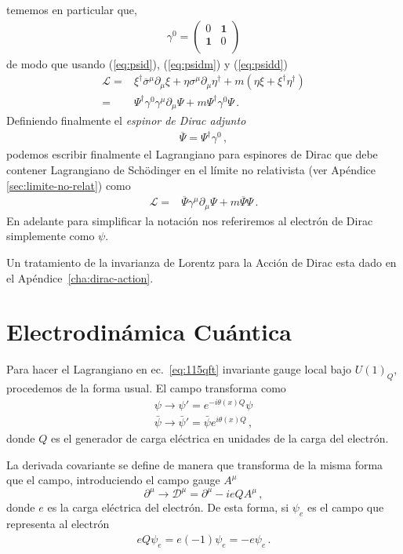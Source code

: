 tememos en particular que, 
\begin{align}
  \gamma^0= \begin{pmatrix}
    0           &\mathbf{1}\\
    \mathbf{1} &0\\
  \end{pmatrix}
\end{align}
de modo que usando (\ref{eq:psid}), (\ref{eq:psidm}) y (\ref{eq:psidd})
\begin{align}
  \mathcal{L}=&\xi^{\dagger}\overline{\sigma}^{\mu}\partial_{\mu}\xi+\eta\sigma^{\mu}\partial_{\mu}\eta^{\dagger}
+m \left(\eta\xi+\xi^{\dagger}\eta^{\dagger} \right)\nonumber\\
=&\Psi^{\dagger}\gamma^{0}\gamma^{\mu}\partial_{\mu}\Psi+m\Psi^{\dagger}\gamma^{0}\Psi\,.
\end{align}
Definiendo finalmente el \emph{espinor de Dirac adjunto}
\begin{align}
  \overline{\Psi}=\Psi^{\dagger}\gamma^{0}\,,
\end{align}
podemos escribir finalmente el Lagrangiano para espinores de Dirac que debe contener Lagrangiano de Sch\"odinger en el límite no relativista (ver Apéndice \ref{sec:limite-no-relat}) como
\begin{align}
  \mathcal{L}=&\overline{\Psi}\gamma^{\mu}\partial_{\mu}\Psi+m\overline{\Psi}\Psi\,.
\end{align}
En adelante para simplificar la notación nos referiremos al electrón de Dirac simplemente como $\psi$.

Un tratamiento de la invarianza de Lorentz para la Acción de Dirac esta dado en el Apéndice~\ref{cha:dirac-action}. 


\section{Electrodinámica Cuántica}
\label{sec:electr-cuant}

Para hacer el Lagrangiano en ec.~\eqref{eq:115qft} invariante gauge local bajo $U(1)_Q$, procedemos de la forma usual. El campo transforma como
\begin{align}
  \psi\to\psi'=e^{-i\theta(x)Q}\psi\nonumber\\
  \bar{\psi}\to\bar{\psi}'=\bar{\psi}e^{i\theta(x)Q}\,,
\end{align}
donde $Q$ es el generador de carga eléctrica en unidades de la carga del electrón.

La derivada covariante se define de manera que transforma de la misma forma que el campo, introduciendo el campo gauge $A^\mu$
\begin{equation}
  \label{eq:202qft}
  \partial^\mu\to\mathcal{D}^\mu=\partial^\mu-ieQA^\mu\,,
\end{equation}
donde $e$ es la carga eléctrica del electrón. De esta forma, si $\psi_e$ es el campo que representa al electrón
\begin{align}
  eQ \psi_e=e(-1)\psi_e=-e \psi_e\,.
\end{align}

